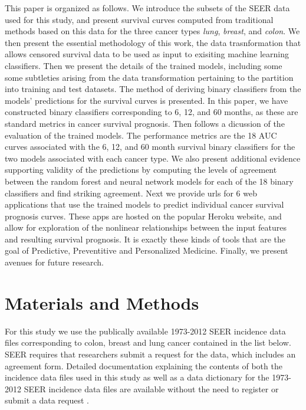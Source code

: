 \documentclass[10pt,letterpaper]{article}
\begin{document}
This paper is organized as follows. We introduce the subsets of the SEER data used for this study, and present survival curves computed from traditional methods based on this data for the three cancer types \emph{lung}, \emph{breast}, and \emph{colon}.
We then present the essential methodology of this work, the data trasnformation that allows censored survival data to be used as input to exisiting machine learning classifiers.  
Then we present the details of the trained models, including some some subtleties arising from the data transformation pertaining to the partition into training and test datasets. The method of deriving binary classifiers from the models'  predictions for the survival curves is presented. In this paper, we have constructed binary classifiers corresponding to 6, 12, and 60 months, as these are standard metrics in cancer survival prognosis. 
Then follows a dicussion of the evaluation of the trained models. The performance metrics are the 18 AUC curves associated with the 6, 12, and 60 month survival binary classifiers for the two models associated with each cancer type. We also present additional evidence supporting validity of the predictions by computing the levels of agreement between the random forest and neural network models for each of the 18 binary classifiers and find striking agreement.
Next we provide urls for 6 web applications that use the trained models to predict individual 
cancer survival prognosis curves. These apps are hosted on the popular Heroku website, and allow for exploration of the nonlinear relationships between the input features and resulting survival prognosis. It is exactly these kinds of tools that are the goal of Predictive, Preventitive and Personalized Medicine. Finally, we present avenues for future research.



\section*{Materials and Methods}
\label{sec:materialsandmethods}
For this study we use the publically available 1973-2012 SEER incidence data files corresponding to colon, breast and lung cancer contained in the list below.
SEER requires that researchers submit a request for the data, which includes an agreement form. Detailed documentation explaining the contents of both the incidence data files used in this study as well as a data dictionary for the 1973-2012 SEER incidence data files are available without the need to register or submit a data request \cite{seerdoc}.
 
\end{document}
